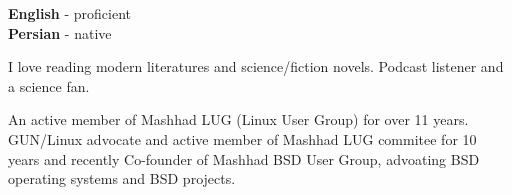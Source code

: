 \documentclass[12pt]{developercv}
\begin{document}

\begin{minipage}[t]{1.0\textwidth}
	\vspace{-\baselineskip} %


	\textbf{English} - proficient\\
	\textbf{Persian} - native\\
\end{minipage}
\hfill
\begin{minipage}[t]{1.0\textwidth}
	\vspace{-\baselineskip} %
	
	
	I love reading modern literatures and science/fiction novels. Podcast listener
	and a science fan.
	\\
\end{minipage}
\hfill
\begin{minipage}[t]{1.0\textwidth}
	\vspace{-\baselineskip} %
	
	
	An active member of Mashhad LUG (Linux User Group) for over 11 years.
	GUN/Linux advocate and active member of Mashhad LUG commitee
	for 10 years and recently Co-founder of Mashhad BSD User Group,
	advoating BSD operating systems and BSD projects.

\end{minipage}

\end{document}
